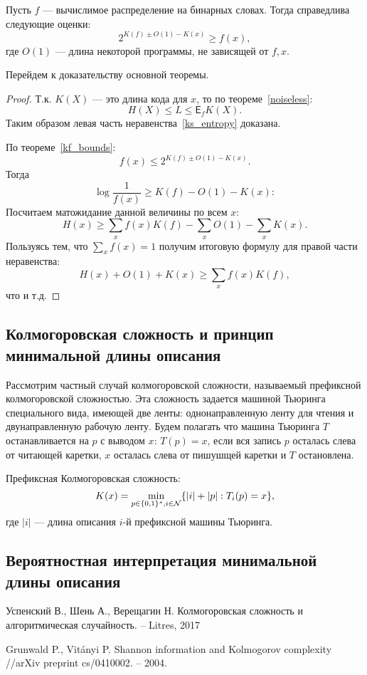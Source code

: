 \documentclass[../main.tex]{subfiles}
\begin{document}
\begin{theorembd}
\label{kf_bounds}
Пусть $f$ --- вычислимое распределение на бинарных словах. Тогда справедлива следующие оценки:
\[
	2^{K(f) \pm O(1) - K(x)} \geq f(x),
\]
где $O(1)$ ---  длина некоторой программы, не зависящей от $f, x$. 
\end{theorembd}

Перейдем к доказательству основной теоремы.
\begin{proof}
Т.к. $K(X)$ --- это длина кода для $x$, то по теореме~\ref{noiseless}:
\[
	H(X) \leq L \leq \mathsf{E}_f K(X).
\]
Таким образом левая часть неравенства~\eqref{ks_entropy}  доказана.

По теореме~\ref{kf_bounds}:
\[
	f(x) \leq 2^{K(f) \pm O(1) - K(x)}.
\]
Тогда
\[
	 \log\frac{1}{f(x)} \geq K(f) - O(1) - K(x):
\]
Посчитаем матожидание данной величины по всем $x$:
\[
	 H(x) \geq \sum_x f(x) K(f) - \sum_x O(1) - \sum_x K(x).
\]
Пользуясь тем, что $\sum_{x} f(x) = 1$ получим итоговую формулу для правой части неравенства:
\[
	 H(x)  +   O(1) +  K(x) \geq \sum_x f(x) K(f),
\]
что и т.д.
\end{proof}




\subsection{Колмогоровская сложность и принцип минимальной длины описания}
Рассмотрим частный случай колмогоровской сложности, называемый префиксной колмогоровской сложностью. Эта сложность задается машиной Тьюринга специального вида, имеющей две ленты: однонаправленную ленту для чтения и двунаправленную рабочую ленту. Будем полагать что машина Тьюринга $T$ останавливается на $p$ с выводом $x$: $T(p) = x$, если вся запись $p$ осталась слева от читающей каретки, $x$ осталась слева от пишушщей каретки и $T$ остановлена.

\begin{definition}
Префиксная Колмогоровская сложность:
\[
K(x) = \min_{p \in \{0,1\}^* ,i \in \mathcal{N}}\{|i|+|p|: T_i(p) = x\},
\]
где $|i|$ --- длина описания $i$-й префиксной машины Тьюринга.
\end{definition}


\subsection{Вероятностная интерпретация минимальной длины описания}




\begin{thebibliography}{99}
	Успенский В., Шень А., Верещагин Н. Колмогоровская сложность и алгоритмическая случайность. – Litres, 2017

Grunwald P., Vitányi P. Shannon information and Kolmogorov complexity //arXiv preprint cs/0410002. – 2004.
\end{thebibliography}
\end{document}
